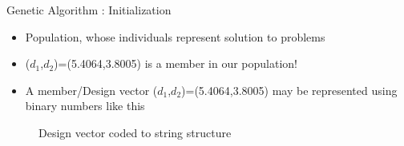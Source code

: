 \documentclass{beamer}
\begin{document}
\begin{frame}{Genetic Algorithm : Initialization}

\begin{itemize}
  \item Population, whose individuals represent solution
to problems
\item ($d_{1}$,$d_{2}$)=(5.4064,3.8005) is a member in our population!
\item A member/Design vector ($d_{1}$,$d_{2}$)=(5.4064,3.8005) may be represented using binary numbers like this

\end{itemize}
\begin{figure}

\caption{\label{fig:your-figure10} Design vector coded to string structure}
\end{figure}
\end{frame}
\end{document}
